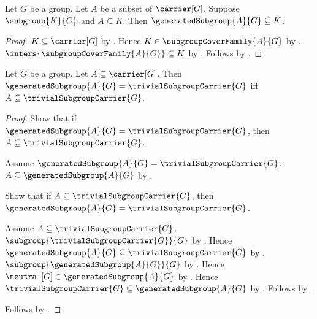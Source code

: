\begin{theorem}\label{generated_subgroup_least}
    Let $G$ be a group.
    Let $A$ be a subset of $\carrier[G]$.
    Suppose $\subgroup{K}{G}$ and $A\subseteq K$.
    Then $\generatedSubgroup{A}{G}\subseteq K$.
\end{theorem}
\begin{proof}
    $K\subseteq\carrier[G]$ by .
    Hence $K\in\subgroupCoverFamily{A}{G}$ by
        .
    $\inters{\subgroupCoverFamily{A}{G}}\subseteq K$ by
        .
    Follows by .
\end{proof}

\begin{theorem}\label{generated_subgroup_eq_trivial_iff}
    Let $G$ be a group.
    Let $A\subseteq\carrier[G]$.
    Then
        $\generatedSubgroup{A}{G}=\trivialSubgroupCarrier{G}$ iff
        $A\subseteq\trivialSubgroupCarrier{G}$.
\end{theorem}
\begin{proof}
    Show that if
        $\generatedSubgroup{A}{G}=\trivialSubgroupCarrier{G}$, then
        $A\subseteq\trivialSubgroupCarrier{G}$.
    \begin{subproof}
        Assume
            $\generatedSubgroup{A}{G}=\trivialSubgroupCarrier{G}$.
        $A\subseteq\generatedSubgroup{A}{G}$ by
            .
    \end{subproof}
    Show that if $A\subseteq\trivialSubgroupCarrier{G}$, then
        $\generatedSubgroup{A}{G}=\trivialSubgroupCarrier{G}$.
    \begin{subproof}
        Assume $A\subseteq\trivialSubgroupCarrier{G}$.
        $\subgroup{\trivialSubgroupCarrier{G}}{G}$ by
            .
        Hence
            $\generatedSubgroup{A}{G}\subseteq
                \trivialSubgroupCarrier{G}$ by
            .
        $\subgroup{\generatedSubgroup{A}{G}}{G}$ by
            .
        Hence $\neutral[G]\in\generatedSubgroup{A}{G}$ by
            .
        Hence
            $\trivialSubgroupCarrier{G}\subseteq
                \generatedSubgroup{A}{G}$ by
            .
        Follows by .
    \end{subproof}
    Follows by \auto.
\end{proof}

